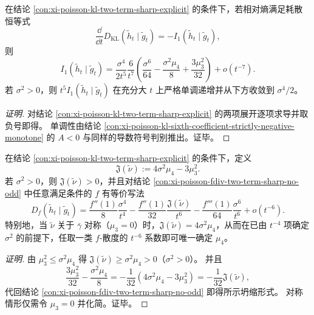 \begin{conclusion}\label{con:xi-poisson-dissipation-i1-two-term-monotone}
在结论 \ref{con:xi-poisson-kl-two-term-sharp-explicit} 的条件下，若相对熵满足耗散恒等式
\[
\frac{\dd}{\dd t}D_{\mathrm{KL}}(\tilde h_t\mid \tilde g_t)=-I_1(\tilde h_t\mid \tilde g_t),
\]
则
\[
I_1(\tilde h_t\mid \tilde g_t)
=\frac{\sigma^4}{2t^5}
\frac{6}{t^7}\left(\frac{\sigma^6}{64}-\frac{\sigma^2\mu_4}{8}+\frac{3\mu_3^2}{32}\right)
+o(t^{-7}).
\]
若 \(\sigma^2>0\)，则 \(t^5I_1(\tilde h_t\mid \tilde g_t)\) 在充分大 \(t\) 上严格单调递增并从下方收敛到 \(\sigma^4/2\)。
\end{conclusion}
\begin{proof}[证明]
对结论 \ref{con:xi-poisson-kl-two-term-sharp-explicit} 的两项展开逐项求导并取负号即得。
单调性由结论 \ref{con:xi-poisson-kl-sixth-coefficient-strictly-negative-monotone} 的 \(A<0\) 与同样的导数符号判别推出。证毕。
\end{proof}

\begin{conclusion}[六阶层的信息单参数坍缩不变量]\label{con:xi-poisson-fdiv-sixth-order-single-parameter-collapse}
在结论 \ref{con:xi-poisson-kl-two-term-sharp-explicit} 的条件下，定义
\[
\mathfrak J(\tilde\nu):=4\sigma^2\mu_4-3\mu_3^2.
\]
若 \(\sigma^2>0\)，则 \(\mathfrak J(\tilde\nu)>0\)，并且对结论 \ref{con:xi-poisson-fdiv-two-term-sharp-no-odd} 中任意满足条件的 \(f\) 有等价写法
\[
D_f(\tilde h_t\mid\tilde g_t)
=\frac{f''(1)}{8}\frac{\sigma^4}{t^4}
-\frac{f''(1)}{32}\frac{\mathfrak J(\tilde\nu)}{t^6}
-\frac{f'''(1)}{64}\frac{\sigma^6}{t^6}
+o(t^{-6}).
\]
特别地，当 \(\tilde\nu\) 关于 \(\bar\gamma\) 对称（\(\mu_3=0\)）时，\(\mathfrak J(\tilde\nu)=4\sigma^2\mu_4\)，从而在已由 \(t^{-4}\) 项确定 \(\sigma^2\) 的前提下，任取一类 \(f\)-散度的 \(t^{-6}\) 系数即可唯一确定 \(\mu_4\)。
\end{conclusion}
\begin{proof}[证明]
由 \(\mu_3^2\le \sigma^2\mu_4\) 得 \(\mathfrak J(\tilde\nu)\ge \sigma^2\mu_4>0\)（\(\sigma^2>0\)）。
并且
\[
\frac{3\mu_3^2}{32}-\frac{\sigma^2\mu_4}{8}
=-\frac{1}{32}(4\sigma^2\mu_4-3\mu_3^2)
=-\frac{1}{32}\mathfrak J(\tilde\nu),
\]
代回结论 \ref{con:xi-poisson-fdiv-two-term-sharp-no-odd} 即得所示坍缩形式。
对称情形仅需令 \(\mu_3=0\) 并化简。证毕。
\end{proof}

\endinput

